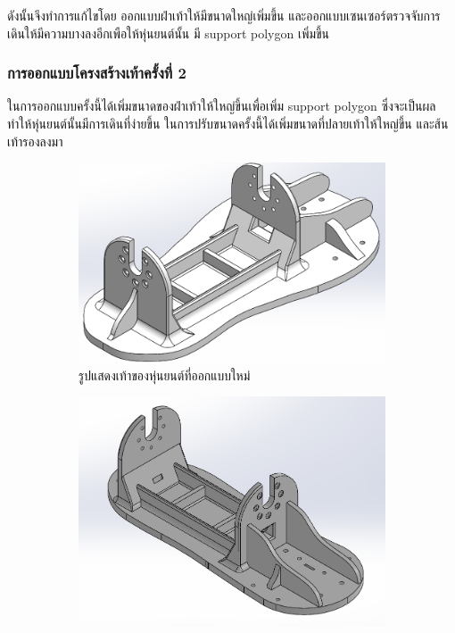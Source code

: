 ดังนั้นจึงทำการแก้ไขโดย ออกแบบฝ่าเท้าให้มีขนาดใหญ่เพิ่มขึ้น และออกแบบเซนเซอร์ตรวจจับการเดินให้มีความบางลงอีกเพือให้หุ่นยนต์นั้น
มี support polygon เพิ่มขึ้น

\clearpage
\subsubsection{การออกแบบโครงสร้างเท้าครั้งที่ 2}
ในการออกแบบครั้งนี้ได้เพิ่มขนาดของฝ่าเท้าให้ใหญ่ขึ้นเพื่อเพิ่ม support polygon ซึ่งจะเป็นผลทำให้หุ่นยนต์นั้นมีการเดินที่ง่ายขึ้น
ในการปรับขนาดครั้งนี้ได้เพิ่มขนาดที่ปลายเท้าให้ใหญ่ขึ้น และส้นเท้ารองลงมา
\begin{figure}[h!]
  \centering
  \begin{subfigure}[b]{0.4\linewidth}
    \includegraphics[width=\linewidth]{chapter4/images/foot_new.PNG}
    \caption{รูปแสดงเท้าของหุ่นยนต์ที่ออกแบบใหม่}
  \end{subfigure}
  \begin{subfigure}[b]{0.4\linewidth}
    \includegraphics[width=\linewidth]{chapter4/images/foot_old.PNG}

\end{subfigure}
\end{figure}
